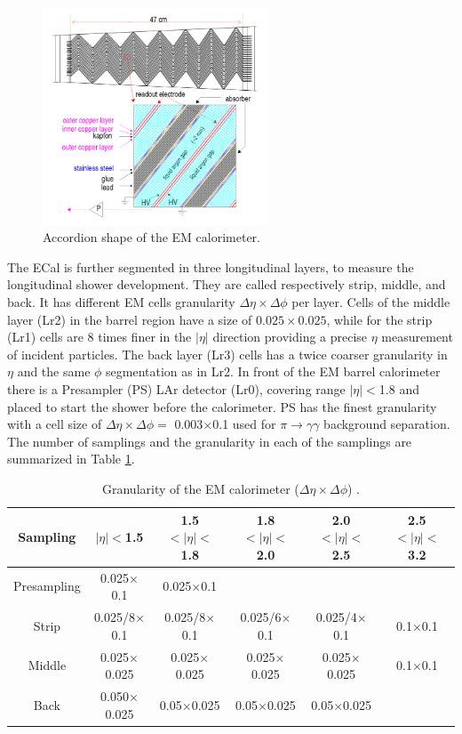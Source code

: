 \begin{figure}[htbp]
    \centering
    \includegraphics[width=0.6\textwidth]{Ch2/Img/ECal_accord.png}
    \caption{Accordion shape of the EM calorimeter.}
    \label{fig:chap2:ATLAS:Calo:ECal:Acc}
\end{figure}
The ECal is further segmented in three longitudinal layers, to measure the longitudinal shower development. They are called respectively strip, middle, and back. It has different EM cells granularity $\Delta\eta\times\Delta\phi$ per layer. Cells of the middle layer (Lr2) in the barrel region have a size of $0.025\times0.025$, while for the strip (Lr1) cells are 8 times finer in the $|\eta|$ direction providing a precise $\eta$ measurement of incident particles. The back layer (Lr3) cells has a twice coarser granularity in $\eta$ and the same $\phi$ segmentation as in Lr2. In front of the EM barrel calorimeter there is a Presampler (PS) LAr detector (Lr0), covering range $|\eta|<$1.8 and placed to start the shower before the calorimeter. PS has the finest granularity with a cell size of $\Delta\eta\times\Delta\phi =$  0.003$\times$0.1 used for $\pi\rightarrow\gamma\gamma$ background separation. The number of samplings  and the granularity in each of the samplings are summarized in Table \ref{tab:chap2:ATLAS:Calo:ECal:Gr}. \\
\begin{table}[htbp]
    \centering
    \begin{tabular}{cccccc}
    \hline
    Sampling & $|\eta|<$1.5 & 1.5$<|\eta|<$1.8 & 1.8$<|\eta|<$2.0 & 2.0$<|\eta|<$2.5 & 2.5$<|\eta|<$3.2 \\
    \hline
    \hline
        Presampling & 0.025$\times$0.1 & 0.025$\times$0.1  \\
        Strip & 0.025/8$\times$0.1 & 0.025/8$\times$0.1 & 0.025/6$\times$0.1 & 0.025/4$\times$0.1 & 0.1$\times$0.1 \\
        Middle & 0.025$\times$0.025 & 0.025$\times$0.025 & 0.025$\times$0.025 & 0.025$\times$0.025 & 0.1$\times$0.1 \\
        Back & 0.050$\times$0.025 & 0.05$\times$0.025 & 0.05$\times$0.025 & 0.05$\times$0.025 \\
        \hline
    \end{tabular}
    \caption{Granularity of the EM calorimeter ($\Delta\eta\times\Delta\phi$) \cite{LAr_TRD}.}
    \label{tab:chap2:ATLAS:Calo:ECal:Gr}
\end{table}
